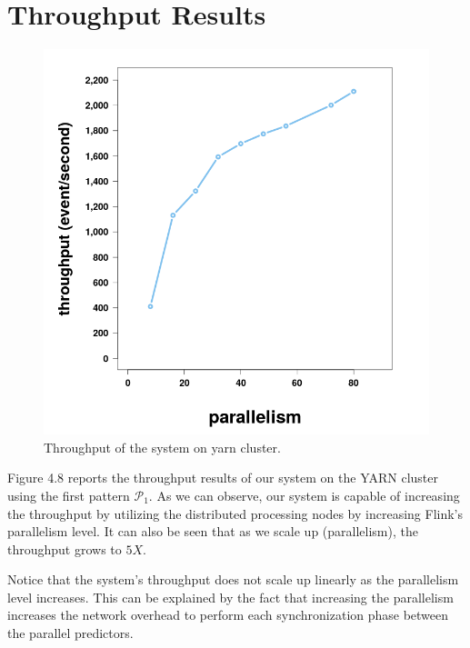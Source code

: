 \section{Throughput Results}
\label{sec:throughput}


\begin{figure}[H]
	
	\includegraphics[width=\textwidth]{chapters/figures/throughput/throughput_seconds.png}
	
	\caption{Throughput of the system on \ac{yarn} cluster.}
	\label{fig:throughput}
\end{figure}

Figure 4.8 reports the throughput results of our system on the YARN cluster using the first pattern $\mathcal{P}_1$.  As we can observe, our system is capable of increasing the throughput by utilizing the distributed processing nodes by increasing Flink's parallelism level. It can also be seen that as we scale up (parallelism), the throughput grows to $5X$.




\par Notice that the system's throughput does not scale up linearly as the parallelism level increases. This can be explained by the fact that increasing the parallelism increases the network overhead to perform each synchronization phase between the parallel predictors.

















